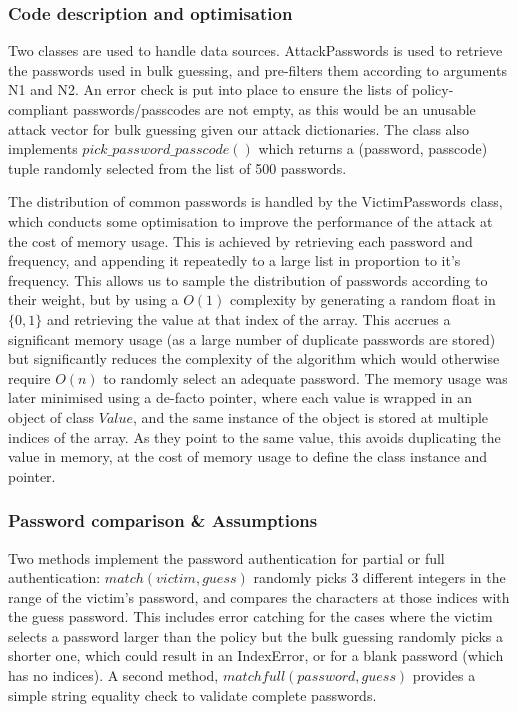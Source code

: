 \documentclass[british,11pt,a4paper]{article}
\begin{document}
\subsubsection{Code description and optimisation}
Two classes are used to handle data sources. AttackPasswords is used to retrieve the passwords used in bulk guessing, and pre-filters them according to arguments N1 and N2. An error check is put into place to ensure the lists of policy-compliant passwords/passcodes are not empty, as this would be an unusable attack vector for bulk guessing given our attack dictionaries. The class also implements $pick\_password\_passcode()$ which returns a (password, passcode) tuple randomly selected from the list of 500 passwords.

The distribution of common passwords is handled by the VictimPasswords class, which conducts some optimisation to improve the performance of the attack at the cost of memory usage. This is achieved by retrieving each password and frequency, and appending it repeatedly to a large list in proportion to it's frequency. This allows us to sample the distribution of passwords according to their weight, but by using a $O(1)$ complexity by generating a random float in $\{0,1\}$ and retrieving the value at that index of the array. This accrues a significant memory usage (as a large number of duplicate passwords are stored) but significantly reduces the complexity of the algorithm which would otherwise require $O(n)$ to randomly select an adequate password. The memory usage was later minimised using a de-facto pointer, where each value is wrapped in an object of class $Value$, and the same instance of the object is stored at multiple indices of the array. As they point to the same value, this avoids duplicating the value in memory, at the cost of memory usage to define the class instance and pointer.

\subsubsection{Password comparison \& Assumptions}
Two methods implement the password authentication for partial or full authentication: $match(victim, guess)$ randomly picks 3 different integers in the range of the victim's password, and compares the characters at those indices with the guess password. This includes error catching for the cases where the victim selects a password larger than the policy but the bulk guessing randomly picks a shorter one, which could result in an IndexError, or for a blank password (which has no indices). A second method, $matchfull(password, guess)$ provides a simple string equality check to validate complete passwords.
\end{document}

